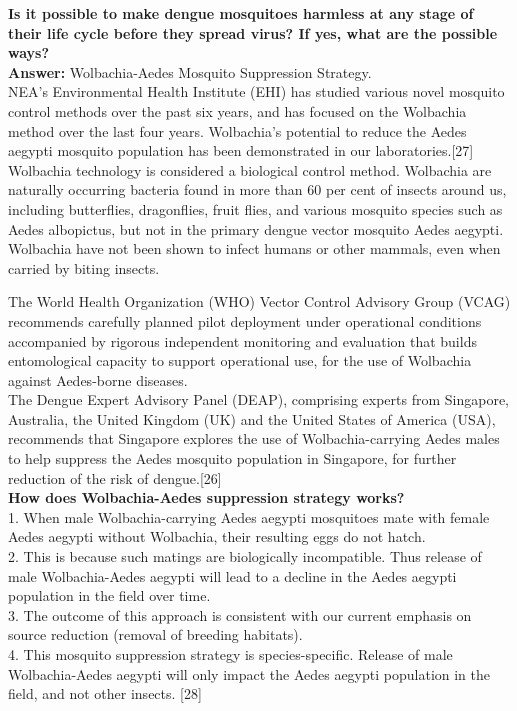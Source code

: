 \documentclass[11pt]{exam}
\begin{document}
\begin{questions}

\question
\label{12. Dengue: Incapaciating Ae.Agypti }
\textbf{Is it possible to make dengue mosquitoes harmless at any stage of their life cycle before they spread virus? If yes, what are the possible ways?}\\
\textbf{Answer:}  Wolbachia-Aedes Mosquito Suppression Strategy.\\

NEA’s Environmental Health Institute (EHI) has studied various novel mosquito control methods over the past six years, and has focused on the Wolbachia method over the last four years. Wolbachia’s potential to reduce the Aedes aegypti mosquito population has been demonstrated in our laboratories.[27]\\ 

Wolbachia technology is considered a biological control method. Wolbachia are naturally occurring bacteria found in more than 60 per cent of insects around us, including butterflies, dragonflies, fruit flies, and various mosquito species such as Aedes albopictus, but not in the primary dengue vector mosquito Aedes aegypti. Wolbachia have not been shown to infect humans or other mammals, even when carried by biting insects.

The World Health Organization (WHO) Vector Control Advisory Group (VCAG) recommends carefully planned pilot deployment under operational conditions accompanied by rigorous independent monitoring and evaluation that builds entomological capacity to support operational use, for the use of Wolbachia against Aedes-borne diseases.\\

The Dengue Expert Advisory Panel (DEAP), comprising experts from Singapore, Australia, the United Kingdom (UK) and the United States of America (USA), recommends that Singapore explores the use of Wolbachia-carrying Aedes males to help suppress the Aedes mosquito population in Singapore, for further reduction of the risk of dengue.[26]\\

\textbf{How does Wolbachia-Aedes suppression strategy works?}\\
1. When male Wolbachia-carrying Aedes aegypti mosquitoes mate with female Aedes aegypti without Wolbachia, their resulting eggs do not hatch.\\
2. This is because such matings are biologically incompatible. Thus release of male Wolbachia-Aedes aegypti will lead to a decline in the Aedes aegypti population in the field over time.\\
3. The outcome of this approach is consistent with our current emphasis on source reduction (removal of breeding habitats).\\
4. This mosquito suppression strategy is species-specific. Release of male Wolbachia-Aedes aegypti will only impact the Aedes aegypti population in the field, and not other insects.
[28]\\


\end{questions}
\end{document}
